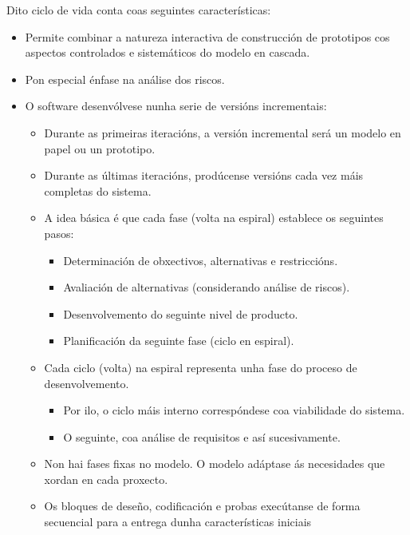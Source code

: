 Dito ciclo de vida conta coas seguintes características:

\begin{itemize}
 \item Permite combinar a natureza interactiva de construcción de prototipos
       cos aspectos controlados e sistemáticos do modelo en cascada.
 \item Pon especial énfase na análise dos riscos.
 \item O software desenvólvese nunha serie de versións incrementais:
       \begin{itemize}
        \item Durante as primeiras iteracións, a versión incremental será un
              modelo en papel ou un prototipo.
        \item Durante as últimas iteracións, prodúcense versións cada vez máis
              completas do sistema.
        \item A idea básica é que cada fase (volta na espiral) establece os
              seguintes pasos:
              \begin{itemize}
               \item Determinación de obxectivos, alternativas e restriccións.
               \item Avaliación de alternativas (considerando análise de
                     riscos).
               \item Desenvolvemento do seguinte nivel de producto.
               \item Planificación da seguinte fase (ciclo en espiral).
              \end{itemize}
        \item Cada ciclo (volta) na espiral representa unha fase do proceso de
              desenvolvemento.
              \begin{itemize}
               \item Por ilo, o ciclo máis interno correspóndese coa
                     viabilidade do sistema.
               \item O seguinte, coa análise de requisitos e así sucesivamente.
              \end{itemize}
        \item Non hai fases fixas no modelo. O modelo adáptase ás necesidades
              que xordan en cada proxecto.
        \item Os bloques de deseño, codificación e probas execútanse de forma
              secuencial para a entrega dunha características iniciais

\end{itemize}
\end{itemize}
